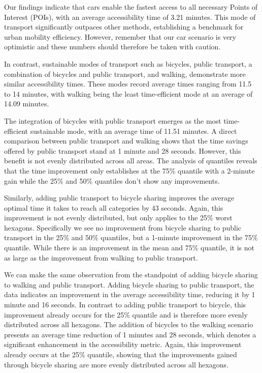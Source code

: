 Our findings indicate that cars enable the fastest access to all necessary Points of Interest (POIs), with an average accessibility time of 3.21 minutes. 
This mode of transport significantly outpaces other methods, establishing a benchmark for urban mobility efficiency.
However, remember that our car scenario is very optimistic and these numbers should therefore be taken with caution.

In contrast, sustainable modes of transport such as bicycles, public transport, a combination of bicycles and public transport, and walking, demonstrate more similar accessibility times. 
These modes record average times ranging from 11.5 to 14 minutes, with walking being the least time-efficient mode at an average of 14.09 minutes. 

The integration of bicycles with public transport emerges as the most time-efficient sustainable mode, with an average time of 11.51 minutes. 
A direct comparison between public transport and walking shows that the time savings offered by public transport stand at 1 minute and 28 seconds. 
However, this benefit is not evenly distributed across all areas.
The analysis of quantiles reveals that the time improvement only establishes at the 75\% quantile with a 2-minute gain while the 25\% and 50\% quantiles don't show any improvements.

Similarly, adding public transport to bicycle sharing improves the average optimal time it takes to reach all categories by 43 seconds.
Again, this improvement is not evenly distributed, but only applies to the 25\% worst hexagons.
Specifically we see no improvement from bicycle sharing to public transport in the 25\% and 50\% quantiles, but a 1-minute improvement in the 75\% quantile.
While there is an improvement in the mean and 75\% quantile, it is not as large as the improvement from walking to public transport.

We can make the same observation from the standpoint of adding bicycle sharing to walking and public transport.
Adding bicycle sharing to public transport, the data indicates an improvement in the average accessibility time, reducing it by 1 minute and 16 seconds.
In contrast to adding public transport to bicycle, this improvement already occurs for the 25\% quantile and is therefore more evenly distributed across all hexagons.
The addition of bicycles to the walking scenario presents an average time reduction of 1 minutes and 28 seconds, which denotes a significant enhancement in the accessibility metric. 
Again, this improvement already occurs at the 25\% quantile, showing that the improvements gained through bicycle sharing are more evenly distributed across all hexagons.


